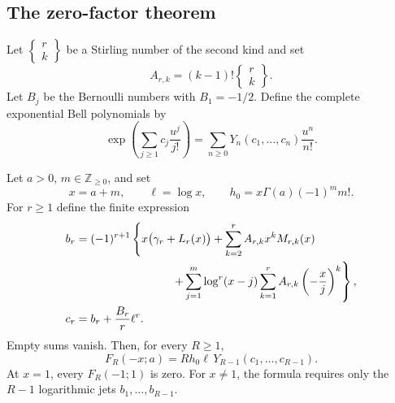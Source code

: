 \subsection{The zero-factor theorem}

Let $\left\{\begin{smallmatrix}r\\k\end{smallmatrix}\right\}$ be a
Stirling number of the second kind and set
\begin{equation}
 A_{r,k}=(k-1)!
        \left\{\begin{matrix}r\\k\end{matrix}\right\}.
 \label{mz:A}
\end{equation}
Let $B_j$ be the Bernoulli numbers with $B_1=-1/2$. Define the complete
exponential Bell polynomials by
\[
 \exp\left(\sum_{j\ge1}c_j\frac{u^j}{j!}\right)
       =\sum_{n\ge0}Y_n(c_1,\ldots,c_n)\frac{u^n}{n!}.
\]

\begin{theorem}
\label{mz:thm:zero}
Let $a>0$, $m\in\mathbb Z_{\ge0}$, and set
\[
 x=a+m,\qquad \ell=\log x,\qquad
 h_0=x\Gamma(a)(-1)^m m!.
\]
For $r\ge1$ define the finite expression
\begin{align}
 b_r={}&(-1)^{r+1}\left\{
      x\bigl(\gamma_r+L_r(x)\bigr)
       +\sum_{k=2}^{r}A_{r,k}x^kM_{r,k}(x)\right.\notag\\
 &\hspace{25mm}\left.
       +\sum_{j=1}^{m}\log^r(x-j)
            \sum_{k=1}^{r}A_{r,k}\left(-\frac xj\right)^k
                        \right\},\label{mz:b}\\
 c_r={}&b_r+\frac{B_r}{r}\ell^r.
 \label{mz:c}
\end{align}
Empty sums vanish. Then, for every $R\ge1$,
\begin{equation}
 \boxed{F_R(-x;a)
    =R h_0\ell\,Y_{R-1}(c_1,\ldots,c_{R-1}).}
 \label{mz:allzero}
\end{equation}
At $x=1$, every $F_R(-1;1)$ is zero. For $x\ne1$, the formula requires
only the $R-1$ logarithmic jets $b_1,\ldots,b_{R-1}$.
\end{theorem}

